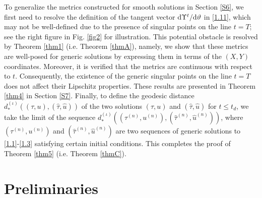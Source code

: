 \documentclass[11pt,reqno]{article}
\numberwithin{equation}{section}
\begin{document}
To generalize the metrics constructed for smooth solutions in Section \ref{S6}, we first need to resolve the definition of the tangent vector ${\rm d}\Upsilon^t/{\rm d}\vartheta$ in \eqref{1.11}, which may not be well-defined due to the presence of singular points on the line $t=T$; see the right figure in Fig. \ref{fig2} for illustration. This potential obstacle is resolved by Theorem \ref{thm1} (i.e. Theorem \ref{thmA}), namely, we show that these metrics are well-posed for generic solutions by expressing them in terms of the $(X,Y)$ coordinates. Moreover, it is verified that the metrics are continuous with respect to $t$. Consequently, the existence of the generic singular points on the line $t=T$ does not affect their Lipschitz properties. These results are presented in Theorem \ref{thm4} in Section \ref{S7}. Finally, to define the geodesic distance
$d_{*}^{(\iota)}((\tau, u),(\hat{\tau}, \hat{u}))$ of the two solutions $(\tau, u)$ and $(\hat{\tau}, \hat{u})$ for $t\leq t_d$, we take the limit of the sequence $d_{*}^{(\iota)}((\tau^{(n)}, u^{(n)}),(\hat{\tau}^{(n)}, \hat{u}^{(n)}))$, where $(\tau^{(n)}, u^{(n)})$ and $(\hat{\tau}^{(n)}, \hat{u}^{(n)})$ are two sequences of generic solutions to \eqref{1.1}-\eqref{1.3} satisfying certain initial conditions. This completes the proof of Theorem \ref{thm5} (i.e. Theorem \ref{thmC}).



\section{Preliminaries}\label{S2}
\end{document}
